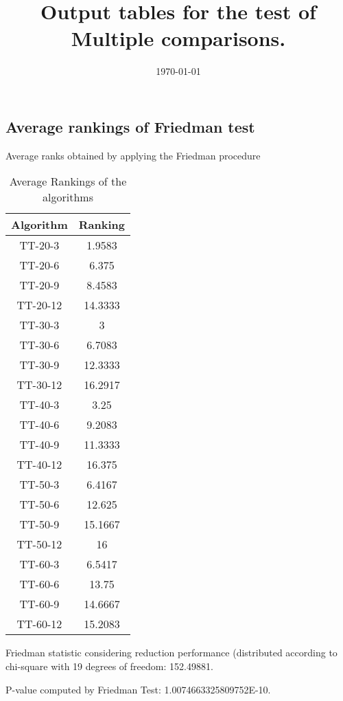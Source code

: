 \documentclass[a4paper,10pt]{article}
\title{Output tables for the test of Multiple comparisons.}
\author{}
\date{\today}
\begin{document}
\begin{landscape}
\pagestyle{empty}
\maketitle
\thispagestyle{empty}
\section{Average rankings of Friedman test}



Average ranks obtained by applying the Friedman procedure

\begin{table}[!htp]
\centering
\begin{tabular}{|c|c|}\hline
Algorithm&Ranking\\\hline
TT-20-3 & 1.9583\\
TT-20-6 & 6.375\\
TT-20-9 & 8.4583\\
TT-20-12 & 14.3333\\
TT-30-3 & 3\\
TT-30-6 & 6.7083\\
TT-30-9 & 12.3333\\
TT-30-12 & 16.2917\\
TT-40-3 & 3.25\\
TT-40-6 & 9.2083\\
TT-40-9 & 11.3333\\
TT-40-12 & 16.375\\
TT-50-3 & 6.4167\\
TT-50-6 & 12.625\\
TT-50-9 & 15.1667\\
TT-50-12 & 16\\
TT-60-3 & 6.5417\\
TT-60-6 & 13.75\\
TT-60-9 & 14.6667\\
TT-60-12 & 15.2083\\
\hline
\end{tabular}
\caption{Average Rankings of the algorithms}
\end{table}

Friedman statistic considering reduction performance (distributed according to chi-square with 19 degrees of freedom: 152.49881.

P-value computed by Friedman Test: 1.0074663325809752E-10.\newline



\pagebreak


\end{landscape}
\end{document}
